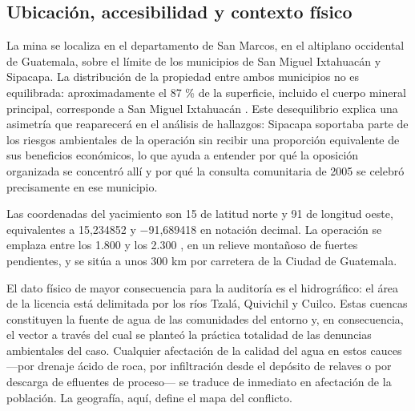 \subsection{Ubicación, accesibilidad y contexto físico}

La mina se localiza en el departamento de San Marcos, en el altiplano occidental
de Guatemala, sobre el límite de los municipios de San Miguel Ixtahuacán y
Sipacapa. La distribución de la propiedad entre ambos municipios no es
equilibrada: aproximadamente el 87 \% de la superficie, incluido el cuerpo
mineral principal, corresponde a San Miguel Ixtahuacán
\parencite{sec2011ni43101}. Este desequilibrio explica una asimetría que
reaparecerá en el análisis de hallazgos: Sipacapa soportaba parte de los riesgos
ambientales de la operación sin recibir una proporción equivalente de sus
beneficios económicos, lo que ayuda a entender por qué la oposición organizada se
concentró allí y por qué la consulta comunitaria de 2005 se celebró precisamente
en ese municipio.

Las coordenadas del yacimiento son 15\textquotedbl{}
de latitud norte y 91\textquotedbl{} de longitud
oeste, equivalentes a 15,234852\textdegree{} y $-$91,689418\textdegree{} en
notación decimal. La operación se emplaza entre los 1.800 y los 2.300 \msnm, en
un relieve montañoso de fuertes pendientes, y se sitúa a unos 300 km por carretera
de la Ciudad de Guatemala.

El dato físico de mayor consecuencia para la auditoría es el hidrográfico: el área
de la licencia está delimitada por los ríos Tzalá, Quivichil y Cuilco. Estas
cuencas constituyen la fuente de agua de las comunidades del entorno y, en
consecuencia, el vector a través del cual se planteó la práctica totalidad de las
denuncias ambientales del caso. Cualquier afectación de la calidad del agua en
estos cauces —por drenaje ácido de roca, por infiltración desde el depósito de
relaves o por descarga de efluentes de proceso— se traduce de inmediato en
afectación de la población. La geografía, aquí, define el mapa del conflicto.

